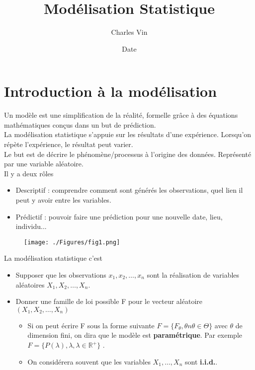 \documentclass{article}
\title{Modélisation Statistique}
\author{Charles Vin}
\date{Date}
\theoremstyle{plain}%
\theoremstyle{definition}
\theoremstyle{remark}
\begin{document}
\maketitle

\tableofcontents
\newpage

\section{Introduction à la modélisation}
Un modèle est une simplification de la réalité, formelle grâce à des équations mathématiques conçus dans un but de prédiction. \\
La modélisation statistique s'appuie sur les résultats d'une expérience. Lorsqu'on répète l'expérience, le résultat peut varier. \\
Le but est de décrire le phénomène/processus à l'origine des données. Représenté par une variable aléatoire.  \\
Il y a deux rôles \begin{itemize}
    \item Descriptif : comprendre comment sont générés les observations, quel lien il peut y avoir entre les variables.
    \item Prédictif : pouvoir faire une prédiction pour une nouvelle date, lieu, individu...
\end{itemize}

\begin{figure}[!htbp]
    \centering
    \texttt{[image: ./Figures/fig1.png]}
    \label{fig1}
\end{figure}

La modélisation statistique c'est \begin{itemize}
    \item Supposer que les observations $ x_1, x_2, \dots, x_n $ sont la réalisation de variables aléatoires $ X_1, X_2, \dots, X_n $.
    \item Donner une famille de loi possible F pour le vecteur aléatoire $ (X_1, X_2, \dots, X_n)$
    \begin{itemize}
        \item Si on peut écrire F sous la forme suivante $F = \{F_\theta , \theta n \theta \in \Theta \}$ avec $ \theta $ de dimension fini, on dira que le modèle est \textbf{paramétrique}. Par exemple $ F = \{P(\lambda ), \lambda , \lambda  \in \mathbb{R}^+\} $ .
        \item On considérera souvent que les variables $X_1, \dots, X_n$ sont \textbf{i.i.d.}. 
    \end{itemize}
\end{itemize}
\end{document}
